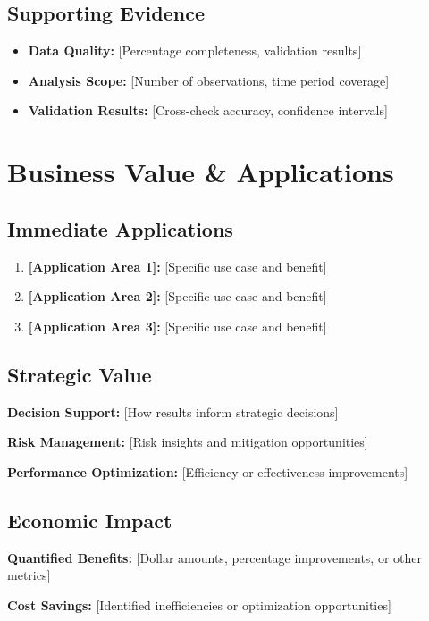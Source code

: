 \documentclass[11pt,letterpaper]{article}
\begin{document}
\subsection{Supporting Evidence}
\begin{itemize}
    \item \textbf{Data Quality:} [Percentage completeness, validation results]
    \item \textbf{Analysis Scope:} [Number of observations, time period coverage]
    \item \textbf{Validation Results:} [Cross-check accuracy, confidence intervals]
\end{itemize}

\section{Business Value \& Applications}

\subsection{Immediate Applications}
\begin{enumerate}
    \item \textbf{[Application Area 1]:} [Specific use case and benefit]
    \item \textbf{[Application Area 2]:} [Specific use case and benefit]
    \item \textbf{[Application Area 3]:} [Specific use case and benefit]
\end{enumerate}

\subsection{Strategic Value}
\textbf{Decision Support:} [How results inform strategic decisions]

\textbf{Risk Management:} [Risk insights and mitigation opportunities]

\textbf{Performance Optimization:} [Efficiency or effectiveness improvements]

\subsection{Economic Impact}
\textbf{Quantified Benefits:} [Dollar amounts, percentage improvements, or other metrics]

\textbf{Cost Savings:} [Identified inefficiencies or optimization opportunities]
\end{document}
